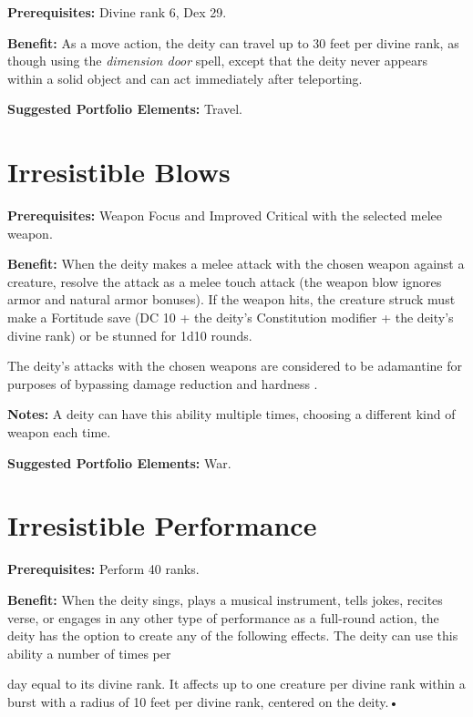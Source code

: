 \documentclass{article}
\begin{document}
\textbf{Prerequisites:} Divine rank 6, Dex 29.

\textbf{Benefit:} As a move action, the deity can travel up to 30 feet per divine 
rank, as though using the \textit{dimension door }spell, except that the deity 
never appears within a solid object and can act immediately after teleporting.

\textbf{Suggested Portfolio Elements:} Travel.

\vspace{12pt}
\section*{Irresistible Blows}

\textbf{Prerequisites:} Weapon Focus and Improved Critical with the selected melee 
weapon.

\textbf{Benefit:} When the deity makes a melee attack with the chosen weapon against 
a creature, resolve the attack as a melee touch attack (the weapon blow ignores 
armor and natural armor bonuses). If the weapon hits, the creature struck must 
make a Fortitude save (DC 10 + the deity's Constitution modifier + the deity's 
divine rank) or be stunned for 1d10 rounds. 

The deity's attacks with the chosen weapons are considered to be adamantine for 
purposes of bypassing damage reduction and hardness{\color{color06} .}

\textbf{Notes:} A deity can have this ability multiple times, choosing a different 
kind of weapon each time.

\textbf{Suggested Portfolio Elements:} War.

\vspace{12pt}
\section*{Irresistible Performance}

\textbf{Prerequisites:} Perform 40 ranks.

\textbf{Benefit:} When the deity sings, plays a musical instrument, tells jokes, 
recites verse, or engages in any other type of performance as a full-round action, 
the deity has the option to create any of the following effects. The deity can 
use this ability a number of times per

day equal to its divine rank. It affects up to one creature per divine rank within 
a burst with a radius of 10 feet per divine rank, centered on the deity.• 
\end{document}
